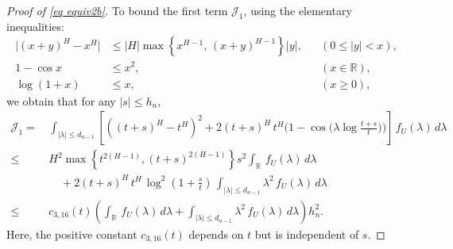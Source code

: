 \documentclass[11pt, reqno]{amsart}
\numberwithin{equation}{section}
\newcommand{\1}{{\bf 1}}
\newcommand{\2}{{\bf 2}}
\begin{document}
\begin{proof}[Proof of \eqref{eq equiv2b}]
To bound the first term $\mathcal J_1$,   using the    elementary inequalities:
 \begin{align*}
\bigl|(x+y)^H-x^H\bigr| &\le |H| \max\left\{x^{H-1},\,(x+y)^{H-1}\right\}|y|, && (0\le |y|<x),\\ 
1-\cos x &\le x^{2}, && (x\in\mathbb R),\\ 
\log (1+x) &\le x, && (x\ge0),
\end{align*}
 we   obtain  that for any $|s|\le h_n$,
\begin{equation}\label{Eq:J3}
\begin{split}
\mathcal J_1 =&\, \int_{|\lambda|\le d_{n-1}} \left[\left((t+s)^{H} -
t^{H}\right)^2  + 2 (t+s)^{H}\,t^{H} \Big( 1 - \cos\Big( \lambda \log 
\frac{t+s}t\Big)\Big)\right] \,f_U(\lambda)\, d\lambda\\
  \le &\,   {H^2}\max\left\{ t^{2(H-1)},  (t+s)^{2(H-1)}  \right\}s^{2}  \int_{\mathbb R}
\,f_U(\lambda)\, d\lambda \\
& \quad \ + 2(t+s)^{H}\, t^H\, \log  ^2\left(1+\frac{s}t\right)\,
\int_{|\lambda|\le d_{n-1}}  \lambda^2
\,f_U(\lambda)\, d\lambda\\
  \le &\, c_{3,16}(t)  \left( \int_{\mathbb R}
\,f_U(\lambda)\, d\lambda+ \int_{|\lambda|\le d_{n-1}}  \lambda^2
\,f_U(\lambda)\, d\lambda \right)h_n^{2}.
\end{split}
\end{equation}
Here, the positive constant $c_{3,16}(t)$ depends on $t$ but is independent of $s$.


\end{proof}
\end{document}
